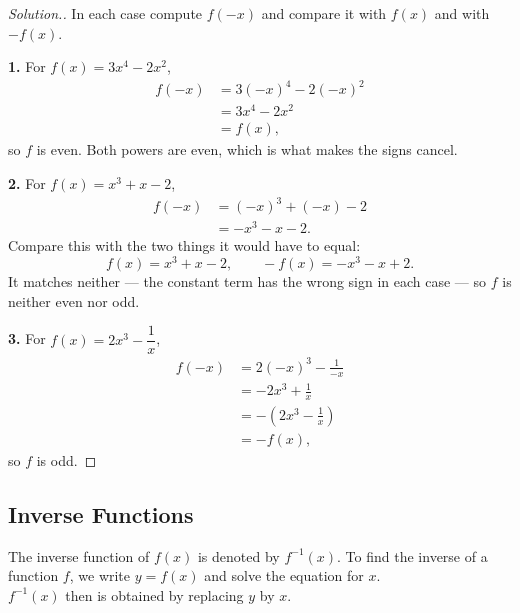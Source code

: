 \documentclass[11pt,a4paper]{article}
\theoremstyle{definition}
\newenvironment{solution}
  {\renewcommand{\qedsymbol}{}\begin{proof}[\textit{Solution}.]}
  {\end{proof}}
\begin{document}
\begin{solution}

In each case compute $f(-x)$ and compare it with $f(x)$ and with $-f(x)$.

\textbf{1.} For $f(x)=3x^{4}-2x^{2}$,
\begin{align*}
f(-x) & = 3(-x)^{4}-2(-x)^{2}\\
      & = 3x^{4}-2x^{2}\\
      & = f(x),
\end{align*}
so $f$ is even. Both powers are even, which is what makes the signs cancel.

\textbf{2.} For $f(x)=x^{3}+x-2$,
\begin{align*}
f(-x) & = (-x)^{3}+(-x)-2\\
      & = -x^{3}-x-2 .
\end{align*}
Compare this with the two things it would have to equal:
$$f(x)=x^{3}+x-2,\qquad -f(x)=-x^{3}-x+2 .$$
It matches neither --- the constant term has the wrong sign in each case --- so
$f$ is neither even nor odd.

\textbf{3.} For $f(x)=2x^{3}-\dfrac{1}{x}$,
\begin{align*}
f(-x) & = 2(-x)^{3}-\frac{1}{-x}\\
      & = -2x^{3}+\frac{1}{x}\\
      & = -\left(2x^{3}-\frac{1}{x}\right)\\
      & = -f(x),
\end{align*}
so $f$ is odd.
\end{solution}
\subsection{Inverse Functions}
The inverse function of $f(x)$ is denoted by $f^{-1}(x)$. To find the inverse of a function $f$, we write $y=f(x)$ and solve the equation for $x$.\\
$f^{-1}(x)$ then is obtained by replacing $y$ by $x$.\\\\
\end{document}
